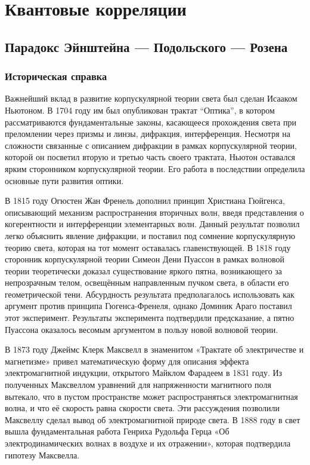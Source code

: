 \section{Квантовые корреляции} 

\subsection{Парадокс Эйнштейна — Подольского — Розена}

\subsubsection{Историческая справка}

Важнейший вклад в развитие корпускулярной теории света был сделан Исааком Ньютоном.
В 1704 году им был опубликован трактат ``Оптика'', 
в котором рассматриваются фундаментальные законы, 
касающееся прохождения света при преломлении через призмы и линзы, дифракция, интерференция. 
Несмотря на сложности связанные с описанием дифракции в рамках корпускулярной теории, которой он посветил вторую и третью часть своего трактата, 
Ньютон оставался ярким сторонником корпускулярной теории. 
Его работа в последствии определила основные пути развития оптики.

В 1815 году Огюстен Жан Френель дополнил принцип Христиана Гюйгенса, 
описывающий механизм распространения вторичных волн,
введя представления о когерентности и интерференции элементарных волн. 
Данный результат позволил легко объяснить явление дифракции, 
и поставил под сомнение корпускулярную теорию света, 
которая на тот момент оставалась главенствующей. 
В 1818 году сторонник корпускулярной теории Симеон Дени Пуассон 
в рамках волновой теории теоретически доказал существование яркого пятна, 
возникающего за непрозрачным телом, 
освещённым направленным пучком света, 
в области его геометрической тени.
Абсурдность результата предполагалось использовать как аргумент против принципа Гюгенса-Френеля, 
однако Доминик Араго поставил этот эксперимент.
Результаты эксперимента подтвердили предсказание, 
а пятно Пуассона оказалось весомым аргументом в пользу новой волновой теории.

В 1873 году Джеймс Клерк Максвелл в знаменитом «Трактате об электричестве и магнетизме» 
привел математическую форму для описания эффекта электромагнитной индукции,
открытого Майклом Фарадеем в 1831 году. 
Из полученных Максвеллом уравнений для напряженности магнитного поля вытекало, что в пустом пространстве может распространяться электромагнитная волна, и что её скорость равна скорости света.  
Эти рассуждения позволили Максвеллу сделал вывод об электромагнитной природе света. 
В 1888 году в свет вышла фундаментальная работа Генриха Рудольфа Герца «Об электродинамических волнах в воздухе и их отражении», 
которая подтвердила гипотезу Максвелла. 

